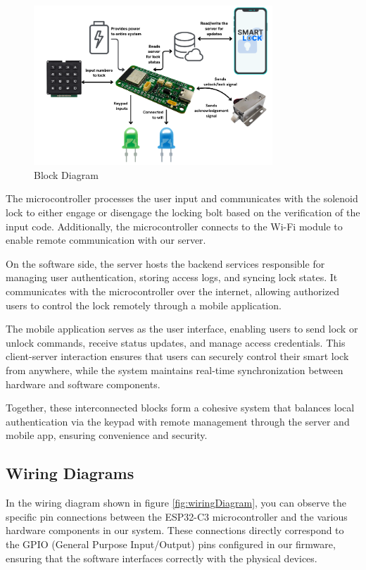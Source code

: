 \begin{figure}[ht]
    \centering
    \includegraphics[width=0.80\textwidth]{img/blockDiagram.png}
    \caption{Block Diagram}
    \label{fig:blockDiagram}
\end{figure}

The microcontroller processes the user input and communicates with the solenoid lock to either engage or disengage the locking bolt based on the verification of the input code. Additionally, the microcontroller connects to the Wi-Fi module to enable remote communication with our server.

On the software side, the server hosts the backend services responsible for managing user authentication, storing access logs, and syncing lock states. It communicates with the microcontroller over the internet, allowing authorized users to control the lock remotely through a mobile application.

The mobile application serves as the user interface, enabling users to send lock or unlock commands, receive status updates, and manage access credentials. This client-server interaction ensures that users can securely control their smart lock from anywhere, while the system maintains real-time synchronization between hardware and software components.

Together, these interconnected blocks form a cohesive system that balances local authentication via the keypad with remote management through the server and mobile app, ensuring convenience and security.

\subsection{Wiring Diagrams}

In the wiring diagram shown in figure \ref{fig:wiringDiagram}, you can observe the specific pin connections between the ESP32-C3 microcontroller and the various hardware components in our system. These connections directly correspond to the GPIO (General Purpose Input/Output) pins configured in our firmware, ensuring that the software interfaces correctly with the physical devices.

